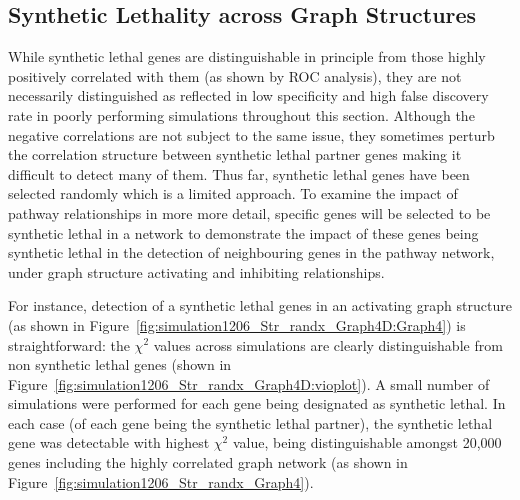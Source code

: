 \FloatBarrier

\subsection{Synthetic Lethality across Graph Structures}
\label{chap5:graphsim_str}

\FloatBarrier

While synthetic lethal genes are distinguishable in principle from those highly positively correlated with them (as shown by \gls{ROC} analysis), they are not necessarily distinguished as reflected in low specificity and high false discovery rate in poorly performing simulations throughout this section. Although the negative correlations are not subject to the same issue, they sometimes perturb the correlation structure between synthetic lethal partner genes making it difficult to detect many of them. Thus far, synthetic lethal genes have been selected randomly which is a limited approach. To examine the impact of pathway relationships in more more detail, specific genes will be selected to be synthetic lethal in a network to demonstrate the impact of these genes being synthetic lethal in the detection of neighbouring genes in the pathway network, under graph structure activating and inhibiting relationships.

For instance, detection of a synthetic lethal genes in an activating graph structure (as shown in Figure~\ref{fig:simulation1206_Str_randx_Graph4D:Graph4}) is straightforward: the $\chi^2$ values across simulations are clearly distinguishable from non synthetic lethal genes (shown in Figure~\ref{fig:simulation1206_Str_randx_Graph4D:vioplot}). A small number of simulations were performed for each gene being designated as synthetic lethal. In each case (of each gene being the synthetic lethal partner), the synthetic lethal gene was detectable with highest $\chi^2$ value, being distinguishable amongst 20,000 genes including the highly correlated graph network (as shown in Figure~\ref{fig:simulation1206_Str_randx_Graph4}).


